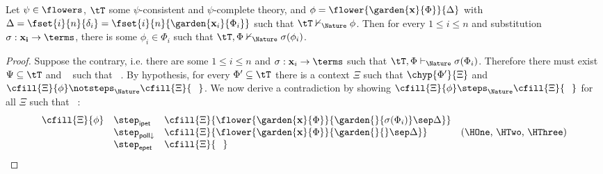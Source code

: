 \begin{proposition}
  
  Let $\psi \in \flowers$, $\tT$ some $\psi$-consistent and $\psi$-complete
  theory, and $\phi = \flower{\garden{\mathbf{x}}{\Phi}}{\Delta}$ with $\Delta
  = \fset{i}{n}{\delta_i} = \fset{i}{n}{\garden{\mathbf{x}_i}{\Phi_i}}$ such
  that $\tT \nvdash_\Nature \phi$. Then for every $1 \leq i \leq n$ and substitution
  $\sigma : \mathbf{x_i} \to \terms$, there is some $\phi_i \in \Phi_i$ such
  that $\tT, \Phi \nvdash_\Nature \sigma(\phi_i)$.
\end{proposition}
\begin{proof}
  Suppose the contrary, i.e. there are some $1 \leq i \leq n$ and $\sigma :
  \mathbf{x}_i \to \terms$ such that $\tT, \Phi \vdash_\Nature \sigma(\Phi_i)$.
  Therefore there must exist $\Psi \subseteq \tT$ and \Hyp{$\Phi_0 \subseteq
  \Phi$}~{\HOne} such that ~{\HTwo}. By hypothesis, for every $\Phi' \subseteq \tT$ there
  is a context $\Xi$ such that $\chyp{\Phi'}{\Xi}$ and $\cfill{\Xi}{\phi}
  \notsteps_\Nature \cfill{\Xi}{\phantom{\Phi}}$. We now derive a contradiction
  by showing $\cfill{\Xi}{\phi} \steps_\Nature \cfill{\Xi}{\phantom{\Phi}}$ for
  all $\Xi$ such that \Hyp{$\chyp{\Psi}{\Xi}$}~{\HThree}:
  $$
  \begin{array}{rlll}
    \cfill{\Xi}{\phi}
    &\step_{\mathsf{ipet}} &\cfill{\Xi}{\flower{\garden{\mathbf{x}}{\Phi}}{\garden{{}}{\sigma(\Phi_i)} \sep \Delta}} & \\
    &\step_{\mathsf{poll}{\downarrow}} &\cfill{\Xi}{\flower{\garden{\mathbf{x}}{\Phi}}{\garden{{}}{{}} \sep \Delta}} &\text{(\HOne, \HTwo, \HThree)} \\
    &\step_{\mathsf{epet}} &\cfill{\Xi}{\phantom{\Phi}} &
  \end{array}
  $$
\end{proof}

